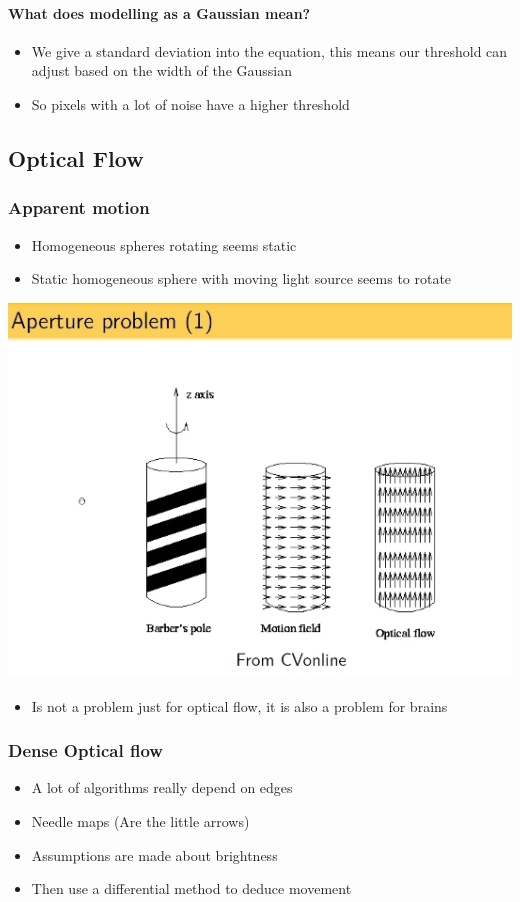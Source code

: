 \documentclass[a4paper]{article}
\begin{document}
\paragraph{What does modelling as a Gaussian mean?}
\label{sec-4-1-4-1}
\begin{itemize}
\item We give a standard deviation into the equation, this means our threshold can adjust based on the width of the Gaussian
\item So pixels with a lot of noise have a higher threshold
\end{itemize}

\subsection{Optical Flow}
\label{sec-4-2}
\subsubsection{Apparent motion}
\label{sec-4-2-1}
\begin{itemize}
\item Homogeneous spheres rotating seems static
\item Static homogeneous sphere with moving light source seems to rotate
\end{itemize}
\includegraphics[width=.9\linewidth]{./app.png}
\begin{itemize}
\item Is not a problem just for optical flow, it is also a problem for brains
\end{itemize}

\subsubsection{Dense Optical flow}
\label{sec-4-2-2}
\begin{itemize}
\item A lot of algorithms really depend on edges
\item Needle maps (Are the little arrows)
\item Assumptions are made about brightness
\item Then use a differential method to deduce movement
\end{itemize}
\end{document}
